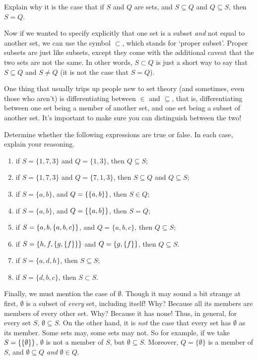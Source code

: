 \begin{exc}
Explain why it is the case that if $S$ and $Q$ are sets, and $S \subseteq Q$ and $Q \subseteq S$, then $S=Q$.
\end{exc}

Now if we wanted to specify explicitly that one set is a subset \textit{and} not equal to another set, we can use the symbol $\subset$, which stands for `proper subset'. Proper subsets are just like subsets, except they come with the additional caveat that the two sets are not the same. In other words, $S \subset Q$ is just a short way to say that $S \subseteq Q$ and $S \neq Q$ (it is not the case that $S = Q$). 

One thing that usually trips up people new to set theory (and sometimes, even those who aren't) is differentiating between $\in$ and $\subseteq$, that is, differentiating between one set being a member of another set, and one set being a subset of another set. It's important to make sure you can distinguish between the two!

\begin{exc}
Determine whether the following expressions are true or false. In each case, explain your reasoning. 

\begin{enumerate}
	\item if $S=\{1, 7, 3\}$ and $Q=\{1, 3\}$, then $Q \subseteq S$;
	\item if $S=\{1, 7, 3\}$ and $Q=\{7, 1, 3\}$, then $S \subseteq Q$ and $Q \subseteq S$;
	\item if $S=\{a, b\}$, and $Q=\{\{a, b\}\}$, then $S \in Q$;
	\item if $S=\{a, b\}$, and $Q=\{\{a, b\}\}$, then $S = Q$;
	\item if $S=\{a, b, \{a, b, c\}\}$, and $Q=\{a, b, c\}$, then $Q \subseteq S$;
	\item if $S=\{h, f, \{g,\{f\}\}\}$ and $Q=\{g, \{f\}\}$, then $Q \subseteq S$. 
	\item if $S=\{a, d, h\}$, then $S \subseteq S$;
	\item if $S=\{d, b, c\}$, then $S \subset S$.
\end{enumerate}
\end{exc}

Finally, we must mention the case of $\emptyset$. Though it may sound a bit strange at first, $\emptyset$ is a subset of \textit{every} set, including itself! Why? Because all its members are members of every other set. Why? Because it has none! Thus, in general, for every set $S$, $\emptyset \subseteq S$. On the other hand, it is \textit{not} the case that every set has $\emptyset$ as its member. Some sets may, some sets may not. So for example, if we take $S=\{\{\emptyset\}\}$, $\emptyset$ is not a member of $S$, but $\emptyset \subseteq S$. Moreover, $Q=\{\emptyset\}$ is a member of $S$, and $\emptyset \subseteq Q$ \textit{and} $\emptyset \in Q$. 

